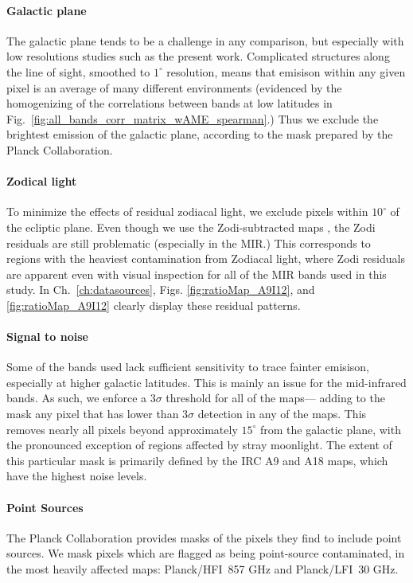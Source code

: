         \paragraph{Galactic plane}
          The galactic plane tends to be a challenge in any comparison, but especially with low resolutions studies such as the present work. Complicated structures along the line of sight, smoothed to $1^{\circ}$ resolution, means that emisison within any given pixel is an average of many different environments (evidenced by the homogenizing of the correlations between bands at low latitudes in Fig.~\ref{fig:all_bands_corr_matrix_wAME_spearman}.) Thus we exclude the brightest emission of the galactic plane, according to the mask prepared by the Planck Collaboration.

        \paragraph{Zodical light}
          To minimize the effects of residual zodiacal light, we exclude pixels within $10^{\circ}$ of the ecliptic plane.  Even though we use the Zodi-subtracted maps \citep{kelsall98, kondo16, ootsubo16}, the Zodi residuals are still problematic (especially in the MIR.) This corresponds to regions with the heaviest contamination from Zodiacal light, where Zodi residuals are apparent even with visual inspection for all of the MIR bands used in this study. In Ch.~\ref{ch:datasources}, Figs. \ref{fig:ratioMap_A9I12}, and \ref{fig:ratioMap_A9I12} clearly display these residual patterns.

        \paragraph{Signal to noise}
          Some of the bands used lack sufficient sensitivity to trace fainter emisison, especially at higher galactic latitudes. This is mainly an issue for the mid-infrared bands. As such, we enforce a 3$\sigma$ threshold for all of the maps--- adding to the mask any pixel that has lower than 3$\sigma$ detection in any of the maps. This removes nearly all pixels beyond approximately $15^{\circ}$ from the galactic plane, with the pronounced exception of regions affected by stray moonlight. The extent of this particular mask is primarily defined by the IRC A9 and A18 maps, which have the highest noise levels.

       \paragraph{Point Sources}
         The Planck Collaboration provides masks of the pixels they find to include point sources. We mask pixels which are flagged as being point-source contaminated, in the most heavily affected maps: Planck/HFI~857 GHz and Planck/LFI~30 GHz.

